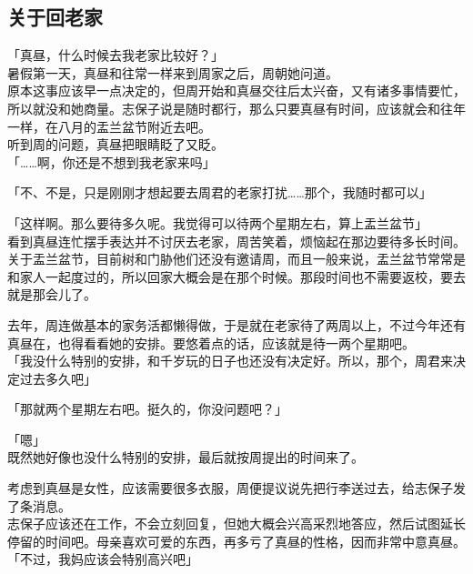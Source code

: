 \subsection{关于回老家}

「真昼，什么时候去我老家比较好？」\\

暑假第一天，真昼和往常一样来到周家之后，周朝她问道。\\

原本这事应该早一点决定的，但周开始和真昼交往后太兴奋，又有诸多事情要忙，所以就没和她商量。志保子说是随时都行，那么只要真昼有时间，应该就会和往年一样，在八月的盂兰盆节附近去吧。\\

听到周的问题，真昼把眼睛眨了又眨。\\

「……啊，你还是不想到我老家来吗」

「不、不是，只是刚刚才想起要去周君的老家打扰……那个，我随时都可以」

「这样啊。那么要待多久呢。我觉得可以待两个星期左右，算上盂兰盆节」\\

看到真昼连忙摆手表达并不讨厌去老家，周苦笑着，烦恼起在那边要待多长时间。\\

关于盂兰盆节，目前树和门胁他们还没有邀请周，而且一般来说，盂兰盆节常常是和家人一起度过的，所以回家大概会是在那个时候。那段时间也不需要返校，要去就是那会儿了。

去年，周连做基本的家务活都懒得做，于是就在老家待了两周以上，不过今年还有真昼在，也得看看她的安排。要悠着点的话，应该就是待一两个星期吧。\\

「我没什么特别的安排，和千岁玩的日子也还没有决定好。所以，那个，周君来决定过去多久吧」

「那就两个星期左右吧。挺久的，你没问题吧？」

「嗯」\\

既然她好像也没什么特别的安排，最后就按周提出的时间来了。

考虑到真昼是女性，应该需要很多衣服，周便提议说先把行李送过去，给志保子发了条消息。\\

志保子应该还在工作，不会立刻回复，但她大概会兴高采烈地答应，然后试图延长停留的时间吧。母亲喜欢可爱的东西，再多亏了真昼的性格，因而非常中意真昼。\\

「不过，我妈应该会特别高兴吧」


